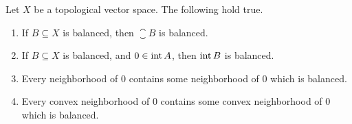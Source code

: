 \begin{prop}
\label{prop:topological_linear_spaces:balanced_set_properties}
Let $X$ be a topological vector space. 
The following hold true. 
\begin{enumerate}
    \item \label{prop:topological_linear_spaces:balanced_set_properties:1}
    If $B \subseteq X$ is balanced, then $\closure{B}$ is balanced. 
    \item \label{prop:topological_linear_spaces:balanced_set_properties:2}
    If $B \subseteq X$ is balanced, and $0 \in \operatorname{int}{A}$, then 
    $\operatorname{int}{B}$ is balanced. 
    \item \label{prop:topological_linear_spaces:balanced_set_properties:3}
    Every neighborhood of $0$ contains some neighborhood of $0$ which 
    is balanced. 
    \item \label{prop:topological_linear_spaces:balanced_set_properties:4}
    Every convex neighborhood of $0$ contains some convex neighborhood 
    of $0$ which is balanced. 
\end{enumerate}
\end{prop}
